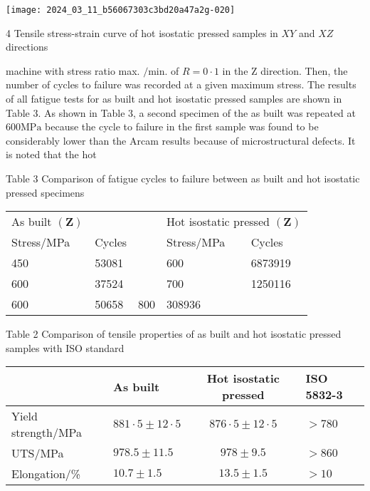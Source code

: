 \documentclass[10pt]{article}
\begin{document}
\begin{center}
\texttt{[image: 2024\_03\_11\_b56067303c3bd20a47a2g-020]}
\end{center}

4 Tensile stress-strain curve of hot isostatic pressed samples in $X Y$ and $X Z$ directions

machine with stress ratio max. $/ \mathrm{min}$. of $R=0 \cdot 1$ in the $\mathrm{Z}$ direction. Then, the number of cycles to failure was recorded at a given maximum stress. The results of all fatigue tests for as built and hot isostatic pressed samples are shown in Table 3. As shown in Table 3, a second specimen of the as built was repeated at $600 \mathrm{MPa}$ because the cycle to failure in the first sample was found to be considerably lower than the Arcam results because of microstructural defects. It is noted that the hot

Table 3 Comparison of fatigue cycles to failure between as built and hot isostatic pressed specimens

\begin{center}
\begin{tabular}{lllll}
As built $(\boldsymbol{Z})$ &  &  & \multicolumn{2}{l}{Hot isostatic pressed $(\boldsymbol{Z})$} \\
\cline { 1 - 2 }
Stress/MPa & Cycles &  & Stress/MPa & \multicolumn{1}{l}{Cycles} \\
\hline
450 & 53081 &  & 600 & 6873919 \\
600 & 37524 &  & 700 & 1250116 \\
600 & 50658 & 800 & 308936 &  \\
\hline
\end{tabular}
\end{center}

Table 2 Comparison of tensile properties of as built and hot isostatic pressed samples with ISO standard

\begin{center}
\begin{tabular}{llcl}
\hline
 & As built & Hot isostatic pressed & ISO 5832-3 \\
\hline
Yield strength/MPa & $881 \cdot 5 \pm 12 \cdot 5$ & $876 \cdot 5 \pm 12 \cdot 5$ & $>780$ \\
UTS/MPa & $978.5 \pm 11.5$ & $978 \pm 9.5$ & $>860$ \\
Elongation/\% & $10.7 \pm 1.5$ & $13.5 \pm 1.5$ & $>10$ \\
\hline
\end{tabular}
\end{center}
\end{document}
